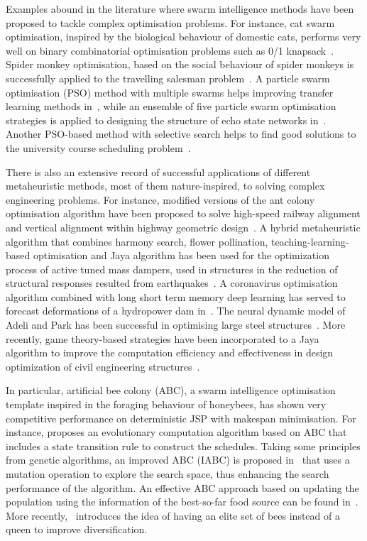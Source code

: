 \documentclass[icae]{iosart2x}
\newcommand{\reviewed}[1]{#1} %
\begin{document}
\reviewed{Examples abound in the literature where swarm intelligence methods have been proposed to tackle complex optimisation problems. For instance, cat swarm optimisation, inspired by the biological behaviour of domestic cats, performs very well on binary combinatorial optimisation problems such as 0/1 knapsack~\cite{Siqueira2021}. Spider monkey optimisation, based on the social behaviour of spider monkeys is successfully applied to the travelling salesman problem~\cite{Akhand2020discrete}. A particle swarm optimisation (PSO) method with multiple swarms helps improving transfer learning methods in~\cite{Liu2021auto}, while an ensemble of five particle swarm optimisation strategies is applied to designing the structure of echo state networks in~\cite{Xue2021self}.  Another PSO-based method with selective search helps to find good solutions to the university course scheduling problem~\cite{ImranHossain2019optimization}.}

\reviewed{There is also an extensive record of successful applications of different metaheuristic methods, most of them nature-inspired, to solving complex engineering problems.  For instance, modified versions of the ant colony optimisation algorithm have been proposed to solve high-speed railway alignment and vertical alignment within highway geometric design~\cite{Roy2022sampling,Sushma2022exploring}. A hybrid metaheuristic algorithm that combines harmony search, flower pollination, teaching-learning-based optimisation and Jaya algorithm has been used for the optimization process of active tuned mass dampers, used in structures in the reduction of structural responses resulted from earthquakes~\cite{Kayabekir2022hybrid}. A coronavirus optimisation algorithm combined with long short term memory deep learning has served to forecast deformations of a hydropower dam in~\cite{Bui2022deformation}.  The neural dynamic model of Adeli and Park has been successful in optimising large steel structures~\cite{Adeli1995optimization, Park1997distributed}.  More recently,  game theory-based strategies have been incorporated to a Jaya algorithm to improve the computation efficiency and effectiveness in design optimization of civil engineering structures~\cite{Mahjoubi2021}.}

In particular, artificial bee colony (ABC), a swarm intelligence optimisation template inspired in the foraging behaviour of honeybees,  has shown very competitive performance on deterministic JSP with makespan minimisation. For instance, \cite{Wong2008} proposes an evolutionary computation algorithm based on ABC that includes a state transition rule to construct the schedules. Taking some principles from genetic algorithms, an improved ABC (IABC) is proposed in~\cite{Yao2010} that uses a mutation operation to explore the search space, thus enhancing the search performance of the algorithm. An effective ABC approach based on updating the population using the information of the best-so-far food source can be found in~\cite{Banharnsakun2012}. More recently,~\cite{Diaz2022} introduces the idea of having an elite set of bees instead of a queen to improve diversification.
\end{document}
